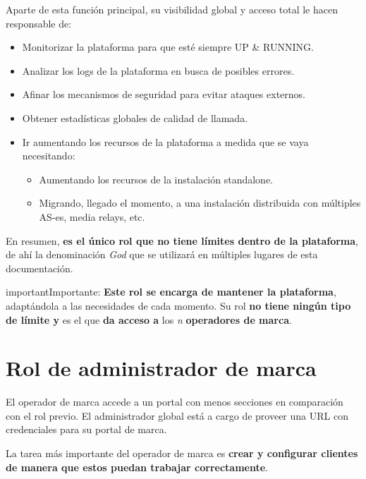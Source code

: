 \documentclass[letterpaper,10pt,spanish]{sphinxmanual}
\begin{document}
Aparte de esta función principal, su visibilidad global y acceso total le hacen responsable de:
\begin{itemize}
\item {} 
Monitorizar la plataforma para que esté siempre UP \& RUNNING.

\item {} 
Analizar los logs de la plataforma en busca de posibles errores.

\item {} 
Afinar los mecanismos de seguridad para evitar ataques externos.

\item {} 
Obtener estadísticas globales de calidad de llamada.

\item {} 
Ir aumentando los recursos de la plataforma a medida que se vaya necesitando:
\begin{itemize}
\item {} 
Aumentando los recursos de la instalación standalone.

\item {} 
Migrando, llegado el momento, a una instalación distribuida con múltiples AS-es, media relays, etc.

\end{itemize}

\end{itemize}

En resumen, \textbf{es el único rol que no tiene límites dentro de la plataforma}, de ahí la denominación \emph{God} que se utilizará en múltiples lugares de esta documentación.

\begin{notice}{important}{Importante:}
\textbf{Este rol se encarga de mantener la plataforma}, adaptándola a las necesidades de cada momento. Su rol \textbf{no tiene ningún tipo de límite y} es el que \textbf{da acceso a} los \emph{n} \textbf{operadores de marca}.
\end{notice}


\section{Rol de administrador de marca}
\label{basic_concepts/operation_roles/index:brand-administrator-role}
El operador de marca accede a un portal con menos secciones en comparación con el rol previo. El administrador global está a cargo de proveer una URL con credenciales para su portal de marca.

La tarea más importante del operador de marca es \textbf{crear y configurar clientes de manera que estos puedan trabajar correctamente}.
\end{document}
